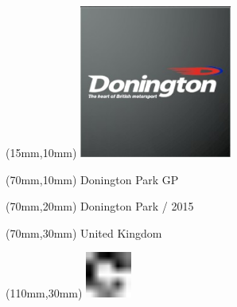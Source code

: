 \null\newpage
\begin{textblock*}{50mm}(15mm,10mm)%
\includegraphics[width=50mm]{LG/2015-05-20_00080.png}
\end{textblock*}
\begin{textblock*}{130mm}(70mm,10mm)%
{\fontsize{20}{20}\selectfont Donington Park GP}\\
\end{textblock*}
\begin{textblock*}{120mm}(70mm,20mm)%
{\fontsize{16}{16}\selectfont Donington Park / 2015}\\
\end{textblock*}
\begin{textblock*}{120mm}(70mm,30mm)%
{\fontsize{12}{12}\selectfont United Kingdom}
\end{textblock*}
\begin{textblock*}{30mm}(110mm,30mm)%
\centering
\includegraphics[height=15mm]{icons/fa-rotate-right.pdf}
\end{textblock*}
